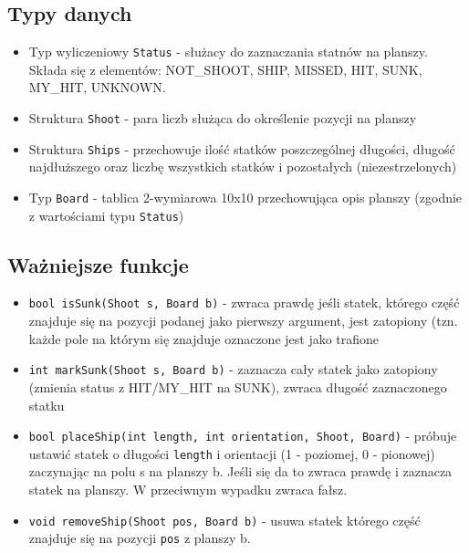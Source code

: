 \documentclass[a4paper]{article}
\begin{document}
\subsection{Typy danych}
\begin{itemize}
    \item Typ wyliczeniowy \texttt{Status} - służacy do zaznaczania statnów na planszy. Składa się z elementów:
    NOT\_SHOOT, SHIP, MISSED, HIT, SUNK, MY\_HIT, UNKNOWN.
    \item Struktura \texttt{Shoot} - para liczb służąca do określenie pozycji na planszy
    \item Struktura \texttt{Ships} - przechowuje ilość statków poszczególnej długości, 
        długość najdłuższego oraz liczbę wszystkich statków i pozostałych (niezestrzelonych)
    \item Typ \texttt{Board} - tablica 2-wymiarowa 10x10 przechowująca opis planszy (zgodnie z wartościami typu \texttt{Status})
\end{itemize}

\subsection{Ważniejsze funkcje}
\begin{itemize}
    \item \texttt{bool isSunk(Shoot s, Board b)} - zwraca prawdę jeśli statek, którego część znajduje się
na pozycji podanej jako pierwszy argument, jest zatopiony (tzn. każde pole na którym się znajduje oznaczone jest
jako trafione
    \item \texttt{int markSunk(Shoot s, Board b)} - zaznacza cały statek jako zatopiony (zmienia status z HIT/MY\_HIT na SUNK),
zwraca długość zaznaczonego statku
    \item \texttt{bool placeShip(int length, int orientation, Shoot, Board)} - próbuje ustawić statek
o długości \texttt{length} i orientacji (1 - poziomej, 0 - pionowej) zaczynając na polu s na planszy b.
Jeśli się da to zwraca prawdę i zaznacza statek na planszy. W przeciwnym wypadku zwraca fałsz.
    \item \texttt{void removeShip(Shoot pos, Board b)} - usuwa statek którego część znajduje się na pozycji \texttt{pos} z planszy b.
\end{itemize}
\end{document}

